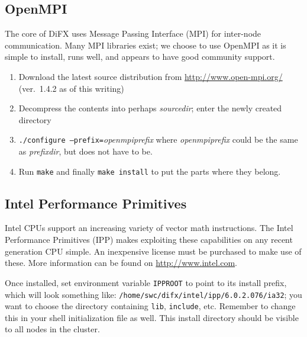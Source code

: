
\subsection{OpenMPI} \label{sec:mpi}

The core of DiFX uses Message Passing Interface (MPI) for inter-node communication.
Many MPI libraries exist; we choose to use OpenMPI as it is simple to install, runs well, and appears to have good community support.
\begin{enumerate}
\item Download the latest source distribution from \url{http://www.open-mpi.org/} (ver.\ 1.4.2 as of this writing)
\item Decompress the contents into perhaps {\em sourcedir}; enter the newly created directory
\item {\tt ./configure --prefix=}{\em openmpiprefix} where {\em openmpiprefix} could be the same as {\em prefixdir}, but does not have to be.
\item Run {\tt make} and finally {\tt make install} to put the parts where they belong.
\end{enumerate}









\subsection{Intel Performance Primitives} \label{sec:ipp}

Intel CPUs support an increasing variety of vector math instructions.  
The Intel Performance Primitives (IPP) makes exploiting these capabilities on any recent generation CPU simple.
An inexpensive license must be purchased to make use of these.
More information can be found on \url{http://www.intel.com}.

Once installed, set environment variable {\tt IPPROOT} to point to its install prefix, which will look something like:
{\tt /home/swc/difx/intel/ipp/6.0.2.076/ia32}; you want to choose the directory containing {\tt lib}, {\tt include}, etc.
Remember to change this in your shell initialization file as well.
This install directory should be visible to all nodes in the cluster.








